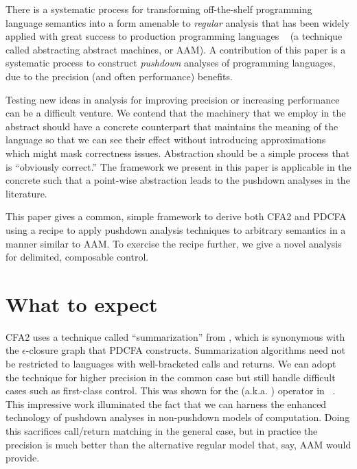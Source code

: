 \documentclass{llncs}
\newcommand{\Scribtexttt}[1]{{\texttt{#1}}}
\newcommand{\SColorize}[2]{\color{#1}{#2}}
\newcommand{\inColor}[2]{{\Scribtexttt{\SColorize{#1}{#2}}}}
\newcommand{\rackett}[1]{\inColor{black}{#1}}
\begin{document}
There is a systematic process for transforming off-the-shelf
programming language semantics into a form amenable to \emph{regular}
analysis that has been widely applied with great success to production
programming languages ~\citet{dvanhorn:VanHorn2010Abstracting} (a
technique called abstracting abstract machines, or AAM). A
contribution of this paper is a systematic process to construct
\emph{pushdown} analyses of programming languages, due to the
precision (and often performance) benefits.

Testing new ideas in analysis for improving precision or increasing
performance can be a difficult venture. We contend that the machinery
that we employ in the abstract should have a concrete counterpart that
maintains the meaning of the language so that we can see their effect
without introducing approximations which might mask correctness
issues. Abstraction should be a simple process that is ``obviously
correct.'' The framework we present in this paper is applicable in the
concrete such that a point-wise abstraction leads to the pushdown
analyses in the literature.

This paper gives a common, simple framework to derive both CFA2 and
PDCFA using a recipe to apply pushdown analysis techniques to
arbitrary semantics in a manner similar to AAM. To exercise the recipe further, 
we give a novel analysis for delimited, composable control. \\

\section{What to expect}

CFA2 uses a technique called ``summarization'' from
\citet[Chapter 7]{local:muchnick:jones:flow-analysis:1981}, which is synonymous with the
$\epsilon$-closure graph that PDCFA constructs. Summarization
algorithms need not be restricted to languages with well-bracketed
calls and returns. We can adopt the technique for higher precision in
the common case but still handle difficult cases such as first-class
control. This was shown for the
\rackett{call-with-current-continuation} (a.k.a. \rackett{call/cc})
operator in ~\citet{ianjohnson:Vardoulakis2011Pushdown}. This
impressive work illuminated the fact that we can harness the enhanced
technology of pushdown analyses in non-pushdown models of
computation. Doing this sacrifices call/return matching in the general
case, but in practice the precision is much better than the
alternative regular model that, say, AAM would provide.
\end{document}
